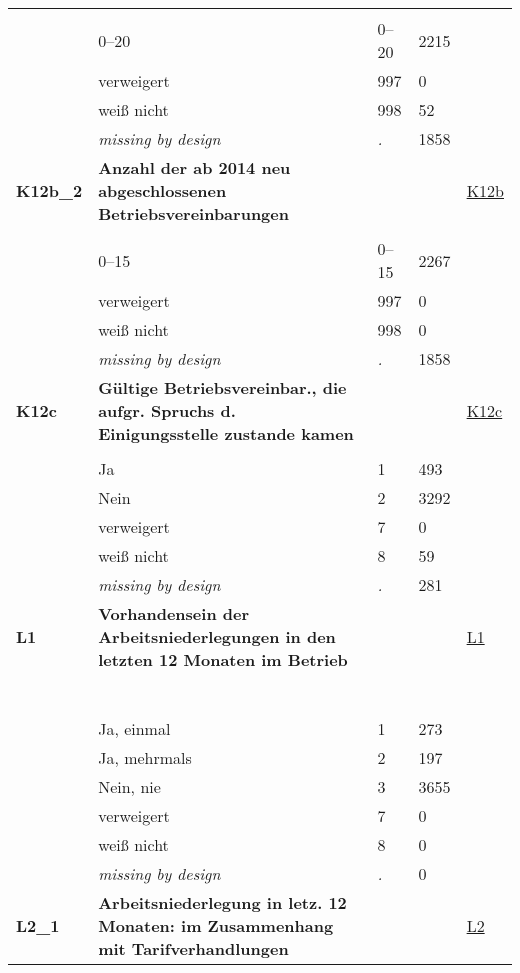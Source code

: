 \begin{longtable}{| L{2.65cm} | L{8cm} | C{1.5cm} | R{1.25cm} | C{2.25cm}  |}
   &  &  &  &  \\ 
   & 0--20 & 0--20 & 2215 &  \\ 
   & verweigert & 997 & 0 &  \\ 
   & weiß nicht & 998 & 52 &  \\ 
   & \textit{missing by design} & \textit{.} & 1858 &  \\ 
   \midrule
\textbf{K12b\_2}\label{var:K12b:2} & \textbf{Anzahl der ab 2014 neu abgeschlossenen Betriebsvereinbarungen} &  &  & \hyperref[K12b]{K12b} \\ 
   &  &  &  &  \\ 
   & 0--15 & 0--15 & 2267 &  \\ 
   & verweigert & 997 & 0 &  \\ 
   & weiß nicht & 998 & 0 &  \\ 
   & \textit{missing by design} & \textit{.} & 1858 &  \\ 
   \midrule
\textbf{K12c}\label{var:K12c} & \textbf{Gültige Betriebsvereinbar., die aufgr. Spruchs d. Einigungsstelle zustande kamen} &  &  & \hyperref[K12c]{K12c} \\ 
   &  &  &  &  \\ 
   & Ja & 1 & 493 &  \\ 
   & Nein & 2 & 3292 &  \\ 
   & verweigert & 7 & 0 &  \\ 
   & weiß nicht & 8 & 59 &  \\ 
   & \textit{missing by design} & \textit{.} & 281 &  \\ 
   \midrule
\textbf{L1}\label{var:L1} & \textbf{Vorhandensein der Arbeitsniederlegungen in den letzten 12 Monaten im Betrieb} &  &  & \hyperref[L1]{L1} \\ 
   & \protect\subsection[Variablen L1 bis N6a\_1]{} &  &  &  \\ 
   & Ja, einmal & 1 & 273 &  \\ 
   & Ja, mehrmals & 2 & 197 &  \\ 
   & Nein, nie & 3 & 3655 &  \\ 
   & verweigert & 7 & 0 &  \\ 
   & weiß nicht & 8 & 0 &  \\ 
   & \textit{missing by design} & \textit{.} & 0 &  \\ 
   \midrule
\textbf{L2\_1}\label{var:L2:1} & \textbf{Arbeitsniederlegung in letz. 12 Monaten: im Zusammenhang mit Tarifverhandlungen} &  &  & \hyperref[L2]{L2} \\ 

\end{longtable}
